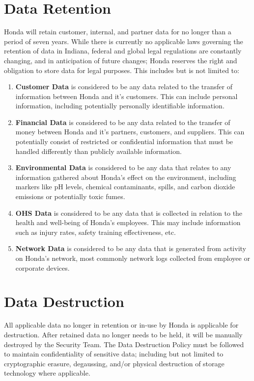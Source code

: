 \section{Data Retention}
Honda will retain customer, internal, and partner data for no longer than a period of seven years. While there is currently no applicable laws governing the retention of data in Indiana, federal and global legal regulations are constantly changing, and in anticipation of future changes; Honda reserves the right and obligation to store data for legal purposes. This includes but is not limited to:
\begin{enumerate}
    \item \textbf{Customer Data} is considered to be any data related to the transfer of information between Honda and it's customers. This can include personal information, including potentially personally identifiable information.
    \item \textbf{Financial Data} is considered to be any data related to the transfer of money between Honda and it's partners, customers, and suppliers. This can potentially consist of restricted or confidential information that must be handled differently than publicly available information.
    \item \textbf{Environmental Data} is considered to be any data that relates to any information gathered about Honda's effect on the environment, including markers like pH levels, chemical contaminants, spills, and carbon dioxide emissions or potentially toxic fumes.
    \item \textbf{OHS Data} is considered to be any data that is collected in relation to the health and well-being of Honda's employees. This may include information such as injury rates, safety training effectiveness, etc.
    \item \textbf{Network Data} is considered to be any data that is generated from activity on Honda's network, most commonly network logs collected from employee or corporate devices.
\end{enumerate}

\section{Data Destruction}
All applicable data no longer in retention or in-use by Honda is applicable for destruction. After retained data no longer needs to be held, it will be manually destroyed by the Security Team. The Data Destruction Policy must be followed to maintain confidentiality of sensitive data; including but not limited to cryptographic erasure, degaussing, and/or physical destruction of storage technology where applicable.

